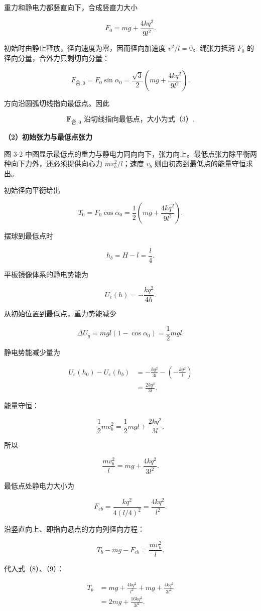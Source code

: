 \documentclass[12pt,a4paper,UTF8]{ctexart}
\begin{document}
重力和静电力都竖直向下，合成竖直力大小

\[F_0=mg+\frac{4kq^2}{9l^2}. \tag{2}\]

初始时由静止释放，径向速度为零，因而径向加速度 \(v^2/l=0\)。绳张力抵消
\(F_0\) 的径向分量，合外力只剩切向分量：

\[F_{\text{合},0}=F_0\sin\alpha_0
=\frac{\sqrt3}{2}\left(mg+\frac{4kq^2}{9l^2}\right). \tag{3}\]

方向沿圆弧切线指向最低点。因此

\[\boxed{\boldsymbol F_{\text{合},0}\text{ 沿切线指向最低点，大小为式（3）}}.\]

\textbf{（2）初始张力与最低点张力}

图 3-2
中图显示最低点的重力与静电力同向向下，张力向上。最低点张力除平衡两种向下力外，还必须提供向心力
\(mv_b^2/l\)；速度 \(v_b\) 则由初态到最低点的能量守恒求出。

初始径向平衡给出

\[T_0=F_0\cos\alpha_0
=\frac12\left(mg+\frac{4kq^2}{9l^2}\right). \tag{4}\]

摆球到最低点时

\[h_b=H-l=\frac l4. \tag{5}\]

平板镜像体系的静电势能为

\[U_e(h)=-\frac{kq^2}{4h}. \tag{6}\]

从初始位置到最低点，重力势能减少

\[\Delta U_g=mgl(1-\cos\alpha_0)=\frac12mgl.\]

静电势能减少量为

\[\begin{aligned}
U_e(h_0)-U_e(h_b)
&=-\frac{kq^2}{3l}-\left(-\frac{kq^2}{l}\right)\\
&=\frac{2kq^2}{3l}.
\end{aligned}\]

能量守恒：

\[\frac12mv_b^2=\frac12mgl+\frac{2kq^2}{3l}. \tag{7}\]

所以

\[\frac{mv_b^2}{l}=mg+\frac{4kq^2}{3l^2}. \tag{8}\]

最低点处静电力大小为

\[F_{eb}=\frac{kq^2}{4(l/4)^2}=\frac{4kq^2}{l^2}. \tag{9}\]

沿竖直向上、即指向悬点的方向列径向方程：

\[T_b-mg-F_{eb}=\frac{mv_b^2}{l}.\]

代入式（8）、（9）：

\[\begin{aligned}
T_b
&=mg+\frac{4kq^2}{l^2}
+mg+\frac{4kq^2}{3l^2}\\
&=2mg+\frac{16kq^2}{3l^2}.
\end{aligned}\]
\end{document}
